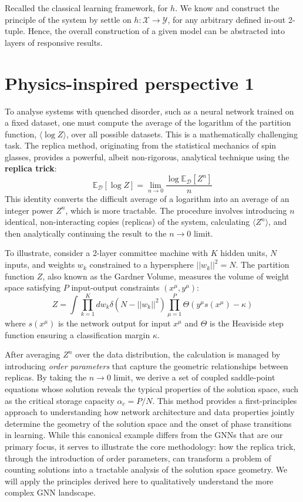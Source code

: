 \documentclass{article}
\begin{document}
Recalled the classical learning framework, for $h$. We know and construct the principle of the system by settle on $h:\mathcal{X}\to \mathcal{Y}$, for any arbitrary defined in-out 2-tuple. Hence, the overall construction of a given model can be abstracted into layers of responsive results. 
\clearpage

\section{Physics-inspired perspective 1}
To analyse systems with quenched disorder, such as a neural network trained on a fixed dataset, one must compute the average of the logarithm of the partition function, $\langle\log Z\rangle$, over all possible datasets. This is a mathematically challenging task. The replica method, originating from the statistical mechanics of spin glasses, provides a powerful, albeit non-rigorous, analytical technique using the \textbf{replica trick}:
\begin{equation}
    \mathbb{E}_{\mathcal{D}}[\log Z] = \lim_{n \to 0} \frac{\log \mathbb{E}_{\mathcal{D}}[Z^n]}{n}
\end{equation}
This identity converts the difficult average of a logarithm into an average of an integer power $Z^n$, which is more tractable. The procedure involves introducing $n$ identical, non-interacting copies (replicas) of the system, calculating $\langle Z^n \rangle$, and then analytically continuing the result to the $n \to 0$ limit.

To illustrate, consider a 2-layer committee machine with $K$ hidden units, $N$ inputs, and weights $w_k$ constrained to a hypersphere $||w_k||^2 = N$. The partition function $Z$, also known as the Gardner Volume, measures the volume of weight space satisfying $P$ input-output constraints $(x^\mu, y^\mu)$:
\begin{equation}
    Z = \int \prod_{k=1}^{K} dw_k \delta(N - ||w_k||^2) \prod_{\mu=1}^{P} \Theta(y^\mu s(x^\mu) - \kappa)
\end{equation}
where $s(x^\mu)$ is the network output for input $x^\mu$ and $\Theta$ is the Heaviside step function ensuring a classification margin $\kappa$.

After averaging $Z^n$ over the data distribution, the calculation is managed by introducing \textit{order parameters} that capture the geometric relationships between replicas. By taking the $n \to 0$ limit, we derive a set of coupled saddle-point equations whose solution reveals the typical properties of the solution space, such as the critical storage capacity $\alpha_c = P/N$. This method provides a first-principles approach to understanding how network architecture and data properties jointly determine the geometry of the solution space and the onset of phase transitions in learning. While this canonical example differs from the GNNs that are our primary focus, it serves to illustrate the core methodology: how the replica trick, through the introduction of order parameters, can transform a problem of counting solutions into a tractable analysis of the solution space geometry. We will apply the principles derived here to qualitatively understand the more complex GNN landscape.
\end{document}
